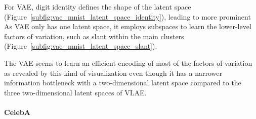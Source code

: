 For \ac{VAE}, digit identity defines the shape of the latent space (Figure~\ref{subfig:vae_mnist_latent_space_identity}), leading to more prominent 
As \ac{VAE} only has one latent space, it employs subspaces to learn the lower-level factors of variation, such as slant within the main clusters (Figure~\ref{subfig:vae_mnist_latent_space_slant}).

The \ac{VAE} seems to learn an efficient encoding of most of the factors of variation as revealed by this kind of visualization even though it has a narrower information bottleneck with a two-dimensional latent space compared to the three two-dimensional latent spaces of \ac{VLAE}.

\paragraph{CelebA}

